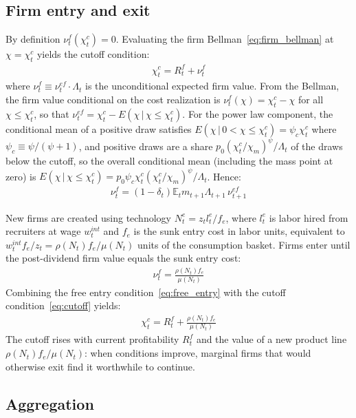 \documentclass[authoryear, review, 12pt]{elsarticle}
\begin{document}
	\subsection{Firm entry and exit}\label{sec:entry_exit}
	
	By definition $\nu_t^f(\chi_t^c)=0$. Evaluating 
	the firm Bellman~\eqref{eq:firm_bellman} at 
	$\chi=\chi_t^c$ yields the cutoff condition:
	\begin{align}\label{eq:cutoff}
		\chi_t^c = R_t^f + \nu_t^f
	\end{align}
	where $\nu_t^f\equiv\nu_t^{ef}\cdot\Lambda_t$ is the 
	unconditional expected firm value. From the Bellman, 
	the firm value conditional on the cost realization is 
	$\nu_t^f(\chi)=\chi_t^c-\chi$ for all $\chi\leq\chi_t^c$, 
	so that $\nu_t^{ef}=\chi_t^c - E(\chi\,|\,\chi\leq\chi_t^c)$. 
	For the power law component, the conditional mean of a 
	positive draw satisfies $E(\chi\,|\,0<\chi\leq\chi_t^c)
	=\psi_c\chi_t^c$ where $\psi_c\equiv\psi/(\psi+1)$, 
	and positive draws are a share $p_0(\chi_t^c/\chi_m)^\psi/\Lambda_t$ of the draws below
	the cutoff, so the overall conditional mean (including the mass point at zero) is
	$E(\chi\,|\,\chi\leq\chi_t^c)=p_0\psi_c\chi_t^c(\chi_t^c/\chi_m)^\psi/\Lambda_t$.
	Hence:
	\begin{align}\label{eq:firm_value_char}
		\nu_t^f = (1-\delta_t)\mathbb{E}_t m_{t+1}
		\Lambda_{t+1}\,\nu_{t+1}^{ef}
	\end{align}
	
	New firms are created using technology $N_t^e=z_t l_t^e/f_e$, 
	where $l_t^e$ is labor hired from recruiters at wage 
	$w_t^{int}$ and $f_e$ is the sunk entry cost in labor units, 
	equivalent to $w_t^{int}f_e/z_t=\rho(N_t)f_e/\mu(N_t)$ 
	units of the consumption basket. Firms enter until the 
	post-dividend firm value equals the sunk entry cost:
	\begin{align}\label{eq:free_entry}
		\nu_t^f = \frac{\rho(N_t)f_e}{\mu(N_t)}
	\end{align}
	Combining the free entry condition~\eqref{eq:free_entry} 
	with the cutoff condition~\eqref{eq:cutoff} yields:
	\begin{align}\label{eq:cutoff_free_entry}
		\chi_t^c = R_t^f + \frac{\rho(N_t)f_e}{\mu(N_t)}
	\end{align}
	The cutoff rises with current profitability $R_t^f$ and 
	the value of a new product line $\rho(N_t)f_e/\mu(N_t)$: 
	when conditions improve, marginal firms that would 
	otherwise exit find it worthwhile to continue.
	\subsection{Aggregation}\label{sec:aggregation}
	
\end{document}
